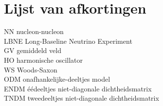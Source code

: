 \documentclass[11pt,twoside]{book}
\begin{document}
\chapter{Lijst van afkortingen}

NN nucleon-nucleon \\
LBNE Long-Baseline Neutrino Experiment \\
GV gemiddeld veld \\
HO harmonische oscillator \\
WS Woods-Saxon \\
ODM onafhankelijke-deeltjes model \\
ENDM \'{e}\'{e}deeltjes niet-diagonale dichtheidsmatrix \\
TNDM tweedeeltjes niet-diagonale dichtheidsmatrix \\




\newpage




\listoffigures
\listoftables
\end{document}

